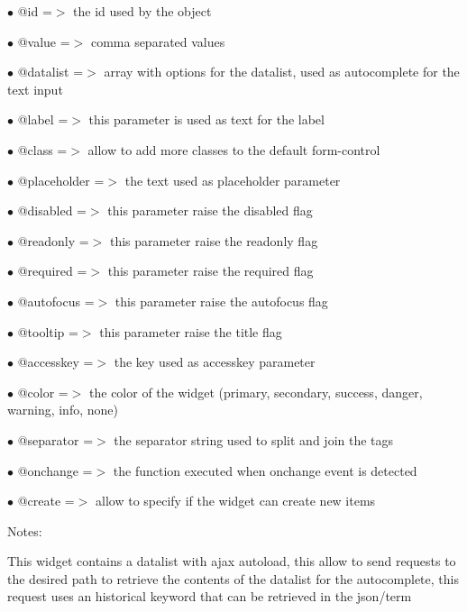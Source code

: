 \documentclass[a4paper]{article}
\begin{document}
\begin{compactitem}
\item[\color{myblue}$\bullet$] @id          =$>$ the id used by the object
\item[\color{myblue}$\bullet$] @value       =$>$ comma separated values
\item[\color{myblue}$\bullet$] @datalist    =$>$ array with options for the datalist, used as autocomplete for the text input
\item[\color{myblue}$\bullet$] @label       =$>$ this parameter is used as text for the label
\item[\color{myblue}$\bullet$] @class       =$>$ allow to add more classes to the default form-control
\item[\color{myblue}$\bullet$] @placeholder =$>$ the text used as placeholder parameter
\item[\color{myblue}$\bullet$] @disabled    =$>$ this parameter raise the disabled flag
\item[\color{myblue}$\bullet$] @readonly    =$>$ this parameter raise the readonly flag
\item[\color{myblue}$\bullet$] @required    =$>$ this parameter raise the required flag
\item[\color{myblue}$\bullet$] @autofocus   =$>$ this parameter raise the autofocus flag
\item[\color{myblue}$\bullet$] @tooltip     =$>$ this parameter raise the title flag
\item[\color{myblue}$\bullet$] @accesskey   =$>$ the key used as accesskey parameter
\item[\color{myblue}$\bullet$] @color       =$>$ the color of the widget (primary, secondary, success, danger, warning, info, none)
\item[\color{myblue}$\bullet$] @separator   =$>$ the separator string used to split and join the tags
\item[\color{myblue}$\bullet$] @onchange    =$>$ the function executed when onchange event is detected
\item[\color{myblue}$\bullet$] @create      =$>$ allow to specify if the widget can create new items
\end{compactitem}

Notes:

This widget contains a datalist with ajax autoload, this allow to send requests
to the desired path to retrieve the contents of the datalist for the autocomplete,
this request uses an historical keyword that can be retrieved in the json/term
\end{document}
